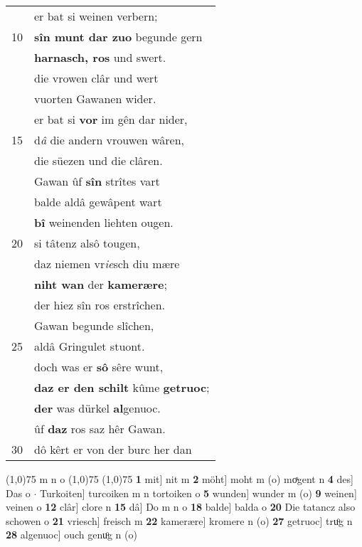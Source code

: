 \documentclass[8pt,a4paper,notitlepage]{article}
\begin{document}
\begin{table}[ht]
\begin{minipage}[t]{0.5\linewidth}
\begin{tabular}{rl}
 & er bat si weinen verbern;\\ 
10 & \textbf{sîn munt dar zuo} begunde gern\\ 
 & \textbf{harnasch, ros} und swert.\\ 
 & die vrowen clâr und wert\\ 
 & vuorten Gawanen wider.\\ 
 & er bat si \textbf{vor} im gên dar nider,\\ 
15 & d\textit{â} die andern vrouwen wâren,\\ 
 & die süezen und die clâren.\\ 
 & Gawan ûf \textbf{sîn} strîtes vart\\ 
 & balde aldâ gewâpent wart\\ 
 & \textbf{bî} weinenden liehten ougen.\\ 
20 & si tâtenz alsô tougen,\\ 
 & daz niemen vr\textit{ie}sch diu mære\\ 
 & \textbf{niht wan} der \textbf{kamerære};\\ 
 & der hiez sîn ros erstrîchen.\\ 
 & Gawan begunde slîchen,\\ 
25 & aldâ Gringulet stuont.\\ 
 & doch was er \textbf{sô} sêre wunt,\\ 
 & \textbf{daz er den schilt} kûme \textbf{getruoc};\\ 
 & \textbf{der} was dürkel \textbf{al}genuoc.\\ 
 & ûf \textbf{daz} ros saz hêr Gawan.\\ 
30 & dô kêrt er von der burc her dan\\ 
\end{tabular}
\scriptsize
\line(1,0){75} \newline
m n o \newline
\line(1,0){75} \newline
\newline
\line(1,0){75} \newline
\textbf{1} mit] nit m \textbf{2} möht] moht m (o) moͯgent n \textbf{4} des] Das o  $\cdot$ Turkoiten] turcoiken m n tortoiken o \textbf{5} wunden] wunder m (o) \textbf{9} weinen] veinen o \textbf{12} clâr] clore n \textbf{15} dâ] Do m n o \textbf{18} balde] balda o \textbf{20} Die tatancz also schowen o \textbf{21} vriesch] freisch m \textbf{22} kamerære] kromere n (o) \textbf{27} getruoc] truͦg n \textbf{28} algenuoc] ouch genuͦg n (o) \newline
\end{minipage}
\end{table}
\end{document}
